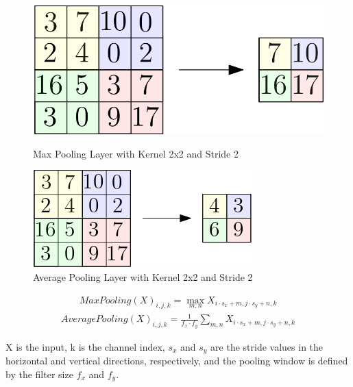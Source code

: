 \documentclass[
a4paper, 
12pt,
grayscalebody, %
abstract=on,
twoside, BCOR10mm, 12pt, DIV13,headinclude, footexclude, final, abstracton, openright
]{ibireprt}
\numberwithin{equation}{chapter}
\numberwithin{table}{chapter}
\numberwithin{figure}{chapter}
\numberwithin{algorithm}{chapter}
\numberwithin{example}{chapter}
\numberwithin{example}{chapter}
\begin{document}
\begin{figure}[h]
	\centering
	\begin{minipage}[t]{.45\linewidth}
		\centering
		\includegraphics[width = \textwidth]{max_pool.png}%
		\caption{Max Pooling Layer with Kernel 2x2 and Stride 2}
		\label{fig:fig_max_pooling}
		
	\end{minipage}
	\hfill
	\begin{minipage}[t]{.45\linewidth}
		\centering
		\includegraphics[width = \textwidth]{average_pool.png}%
		\caption{Average Pooling Layer with Kernel 2x2 and Stride 2}
		\label{fig:fig_average_pooling}
	\end{minipage}
\end{figure}
\begin{align}
	MaxPooling(X)_{i,j,k} = \max_{m,n}X_{i\cdot s_x + m, j \cdot s_y+n,k}
\end{align}
\begin{align}
	AveragePooling(X)_{i,j,k} =\frac{1}{f_x\cdot f_y}\sum_{m,n} X_{i\cdot s_x + m, j \cdot s_y+n,k}
\end{align}

 X is the input, k is the channel index, $s_x$ and $s_y$ are the stride values in the horizontal and vertical directions, respectively, and the pooling window is defined by the filter size $f_x$ and $f_y$.
\end{document}
